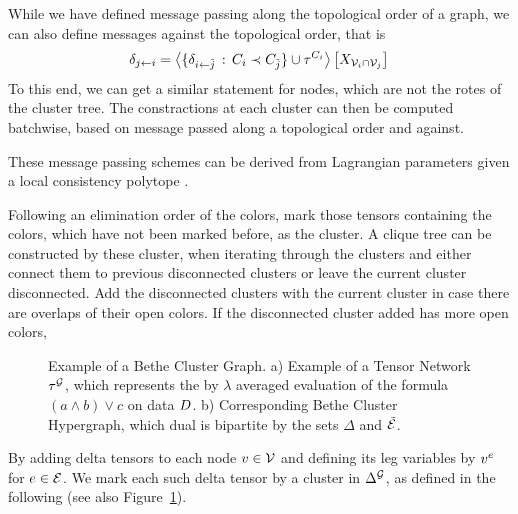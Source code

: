While we have defined message passing along the topological order of a graph, we can also define messages against the topological order, that is
\begin{align*}
	\downmes{i}{j}  = \contractionof{\{\downmes{\tilde{j}}{i} \, : \,  \enc \prec  \thirdenc\} \cup \tnetof{\enc}}{\catvariableof{\nodes_i\cap \nodes_j}} \,
\end{align*}
To this end, we can get a similar statement for nodes, which are not the rotes of the cluster tree.
The constractions at each cluster can then be computed batchwise, based on message passed along a topological order and against.

%
These message passing schemes can be derived from Lagrangian parameters given a local consistency polytope \cite{wainwright_graphical_2008}.





\begin{remark}
	Following an elimination order of the colors, mark those tensors containing the colors, which have not been marked before, as the cluster.
	A clique tree can be constructed by these cluster, when iterating through the clusters and either connect them to previous disconnected clusters or leave the current cluster disconnected.
	Add the disconnected clusters with the current cluster in case there are overlaps of their open colors.
	If the disconnected cluster added has more open colors, 
\end{remark}




\begin{figure}[h]
\begin{center}
	
\end{center}
\caption{Example of a Bethe Cluster Graph.
	a) Example of a Tensor Network $\tnetof{\graph}$, which represents the by $\lambda$ averaged evaluation of the formula $(a\land b)\lor c$ on data $\datamap$.
	b) Corresponding Bethe Cluster Hypergraph, which dual is bipartite by the sets $\Delta$ and $\tilde{\edges}$.
	}
\label{fig:betheDataExample} 
\end{figure}

By adding delta tensors to each node $\node\in\nodes$ and defining its leg variables by $\node^{\edge}$ for $\edge\in\edges$.
We mark each such delta tensor by a cluster in $\Delta^{\graph}$, as defined in the following (see also Figure~\ref{fig:betheDataExample}).

